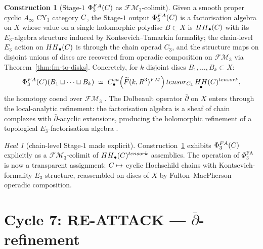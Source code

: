 \documentclass[11pt]{article}
\theoremstyle{definition}
\newtheorem{construction}[theorem]{Construction}
\theoremstyle{remark}
\newtheorem{heal}[theorem]{Heal}
\DeclareMathOperator{\HH}{HH}
\newcommand{\FMbar}{\overline{F}}
\newcommand{\FM}{\mathcal{FM}}
\newcommand{\Ainf}{A_{\infty}}
\newcommand{\PhiFA}{\Phi^{\mathrm{FA}}}
\newcommand{\CY}{\mathrm{CY}}
\begin{document}
\begin{construction}[Stage-$1$ $\PhiFA_3(\cC)$ as $\FM_3$-colimit]
\label{constr:phifa3-via-fm}
Given a smooth proper cyclic $\Ainf$ $\CY_3$ category $C$, the
Stage-$1$ output $\PhiFA_3(\cC)$ is a factorisation algebra on $X$
whose value on a single holomorphic polydisc $B \subset X$ is
$\HH_\bullet(\cC)$ with its $E_3$-algebra structure induced by
Kontsevich--Tamarkin formality; the chain-level $E_3$ action on
$\HH_\bullet(\cC)$ is through the chain operad $C_3$, and the
structure maps on disjoint unions of discs are recovered from
operadic composition on $\FM_3$ via Theorem~\ref{thm:fm-to-disks}.
Concretely, for $k$ disjoint discs $B_1, \ldots, B_k \subset X$:
\[
 \PhiFA_3(\cC)(B_1 \sqcup \cdots \sqcup B_k)
 \;\simeq\; C^{\mathrm{sa}}_\bullet\!\left(\widetilde{\FMbar}(k, \mathbb{R}^3)^{\FM}\right)
  \otimes_{C_3} \HH_\bullet(\cC)^{\otimes k},
\]
the homotopy coend over $\FM_3$ \cite[Costello--Gwilliam 2021, Prop.\ 3.4.3]{CostelloGwilliam2021}.
The Dolbeault operator $\bar\partial$ on $X$ enters through the
local-analytic refinement: the factorisation algebra is a sheaf of
chain complexes with $\bar\partial$-acyclic extensions, producing
the holomorphic refinement of a topological $E_3$-factorisation
algebra \cite[Costello--Li 2016, 2020]{CostelloLi2016, CostelloLi2020}.
\end{construction}

\begin{heal}[chain-level Stage-$1$ made explicit]
\label{heal:cycle-6}
Construction~\ref{constr:phifa3-via-fm} exhibits $\PhiFA_3(\cC)$
explicitly as a $\FM_3$-colimit of $\HH_\bullet(\cC)^{\otimes k}$
assemblies. The operation of $\PhiFA_3$ is now a transparent
assignment: $C \mapsto$ cyclic Hochschild chains with
Kontsevich-formality $E_3$-structure, reassembled on discs of $X$
by Fulton--MacPherson operadic composition.
\end{heal}

\section{Cycle 7: RE-ATTACK --- $\bar\partial$-refinement}
\end{document}

